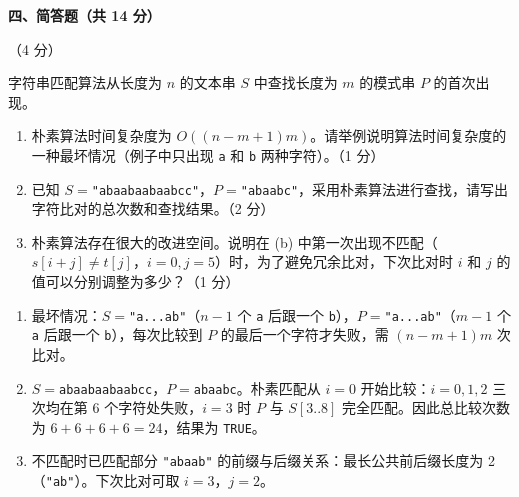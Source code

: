 \clearpage

\textbf{四、简答题（共 14 分）}

\begin{question}[字符串匹配]（4 分）

字符串匹配算法从长度为 $n$ 的文本串 $S$ 中查找长度为 $m$ 的模式串 $P$ 的首次出现。

\begin{enumerate}
  \item 朴素算法时间复杂度为 $O((n-m+1)m)$。请举例说明算法时间复杂度的一种最坏情况（例子中只出现 \texttt{a} 和 \texttt{b} 两种字符）。（1 分）
  \item 已知 $S=$\texttt{"abaabaabaabcc"}，$P=$\texttt{"abaabc"}，采用朴素算法进行查找，请写出字符比对的总次数和查找结果。（2 分）
  \item 朴素算法存在很大的改进空间。说明在 (b) 中第一次出现不匹配（$s[i+j]\neq t[j]$，$i=0,j=5$）时，为了避免冗余比对，下次比对时 $i$ 和 $j$ 的值可以分别调整为多少？（1 分）
\end{enumerate}

\begin{solution}
\begin{enumerate}
  \item 最坏情况：$S=$\texttt{"a...ab"}（$n-1$ 个 \texttt{a} 后跟一个 \texttt{b}），$P=$\texttt{"a...ab"}（$m-1$ 个 \texttt{a} 后跟一个 \texttt{b}），每次比较到 $P$ 的最后一个字符才失败，需 $(n-m+1)m$ 次比对。
  \item $S=$\texttt{abaabaabaabcc}，$P=$\texttt{abaabc}。朴素匹配从 $i=0$ 开始比较：$i=0,1,2$ 三次均在第 $6$ 个字符处失败，$i=3$ 时 $P$ 与 $S[3..8]$ 完全匹配。因此总比较次数为 $6+6+6+6=24$，结果为 \texttt{TRUE}。
  \item 不匹配时已匹配部分 \texttt{"abaab"} 的前缀与后缀关系：最长公共前后缀长度为 2（\texttt{"ab"}）。下次比对可取 $i=3$，$j=2$。
\end{enumerate}
\end{solution}
\end{question}

